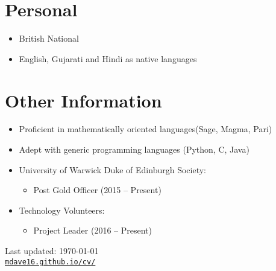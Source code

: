 \documentclass[letterpaper]{article}
\def\footerlink{mdave16.github.io/cv/}
\begin{document}
	\section*{Personal}
	\begin{itemize}
		\item British National
		\item English, Gujarati and Hindi as native languages
		
	\end{itemize}
	\section*{Other Information}
	\begin{itemize}
		\item Proficient in mathematically oriented languages(Sage, Magma, Pari)
		\item Adept with generic programming languages (Python, C, Java)
		\item University of Warwick Duke of Edinburgh Society:
		\begin{itemize}
			\item Post Gold Officer (2015 -- Present)
		\end{itemize}
		\item Technology Volunteers:
		\begin{itemize}
			\item Project Leader (2016 -- Present)
		\end{itemize}
	\end{itemize}
	\bigskip
	\begin{center}
		\begin{footnotesize}
			Last updated: \today \\
			\href{\footerlink}{\texttt{\footerlink}}
		\end{footnotesize}
	\end{center}
\end{document}
